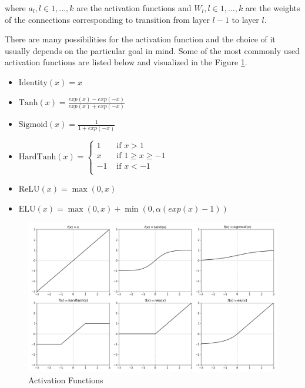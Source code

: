 where $a_l, l \in {1, ..., k}$ are the activation functions and $W_l, l \in {1, ..., k}$ are the weights of the connections corresponding to transition from layer $l-1$ to layer $l$.

There are many possibilities for the activation function and the choice of it usually depends on the particular goal in mind.
Some of the most commonly used activation functions are listed below
and visualized in the Figure \ref{fig:activation_functions}.

\begin{itemize}
    \item $\text{Identity}(x) = x$
    \item $\text{Tanh}(x) = \frac{exp(x) - exp(-x)}{exp(x) + exp(-x)}$
    \item $\text{Sigmoid}(x) = \frac{1}{1 + exp(-x)}$
    \item $\text{HardTanh}(x) = \begin{cases}
             1 & \text{ if } x > 1 \\
             x & \text{ if } 1 \geq x \geq -1 \\
            -1 & \text{ if } x < -1 \\
          \end{cases}$
    \item $\text{ReLU}(x) = \max(0, x)$
    \item $\text{ELU}(x) = \max(0,x) + \min(0, \alpha (exp(x) - 1))$
    \label{list:activations}
\end{itemize}

\begin{figure}
    \centering
    \includegraphics[width=\linewidth]{imgs_tomas/activation_functions.png}
    \caption{Activation Functions}
    \label{fig:activation_functions}
\end{figure}

